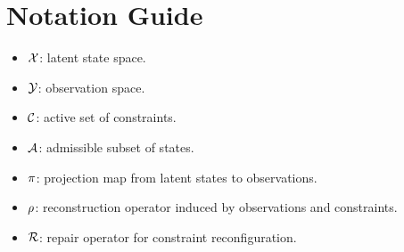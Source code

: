 \chapter*{Notation Guide}

\begin{itemize}
  \item \(\mathcal{X}\): latent state space.
  \item \(\mathcal{Y}\): observation space.
  \item \(\mathcal{C}\): active set of constraints.
  \item \(\mathcal{A}\): admissible subset of states.
  \item \(\pi\): projection map from latent states to observations.
  \item \(\rho\): reconstruction operator induced by observations and constraints.
  \item \(\mathcal{R}\): repair operator for constraint reconfiguration.
\end{itemize}
